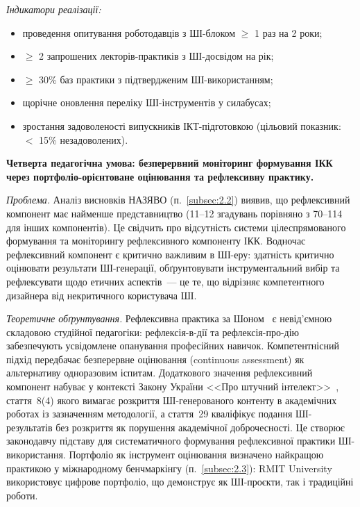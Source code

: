 \textit{Індикатори реалізації:}
\begin{itemize}
    \item проведення опитування роботодавців з ШІ-блоком $\geq$ 1 раз на 2 роки;
    \item $\geq$ 2 запрошених лекторів-практиків з ШІ-досвідом на рік;
    \item $\geq$ 30\% баз практики з підтвердженим ШІ-використанням;
    \item щорічне оновлення переліку ШІ-інструментів у силабусах;
    \item зростання задоволеності випускників ІКТ-підготовкою (цільовий показник: $<$ 15\% незадоволених).
\end{itemize}

\textbf{Четверта педагогічна умова: безперервний моніторинг формування ІКК через портфоліо-орієнтоване оцінювання та рефлексивну практику.}

\textit{Проблема.} Аналіз висновків НАЗЯВО (п.~\ref{subsec:2.2}) виявив, що рефлексивний компонент має найменше представництво (11--12 згадувань порівняно з 70--114 для інших компонентів). Це свідчить про відсутність системи цілеспрямованого формування та моніторингу рефлексивного компоненту ІКК. Водночас рефлексивний компонент є критично важливим в ШІ-еру: здатність критично оцінювати результати ШІ-генерації, обґрунтовувати інструментальний вибір та рефлексувати щодо етичних аспектів~--- це те, що відрізняє компетентного дизайнера від некритичного користувача ШІ.

\textit{Теоретичне обґрунтування.} Рефлексивна практика за Шоном~\cite{Schon1983} є невід'ємною складовою студійної педагогіки: рефлексія-в-дії та рефлексія-про-дію забезпечують усвідомлене опанування професійних навичок. Компетентнісний підхід передбачає безперервне оцінювання (continuous assessment) як альтернативу одноразовим іспитам. Додаткового значення рефлексивний компонент набуває у контексті Закону України <<Про штучний інтелект>>~\cite{ZakonAI2025}, стаття~8(4) якого вимагає розкриття ШІ-генерованого контенту в академічних роботах із зазначенням методології, а стаття~29 кваліфікує подання ШІ-результатів без розкриття як порушення академічної доброчесності. Це створює законодавчу підставу для систематичного формування рефлексивної практики ШІ-використання. Портфоліо як інструмент оцінювання визначено найкращою практикою у міжнародному бенчмаркінгу (п.~\ref{subsec:2.3}): RMIT University використовує цифрове портфоліо, що демонструє як ШІ-проєкти, так і традиційні роботи.

